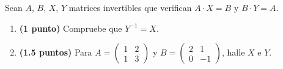 
Sean $A$, $B$, $X$, $Y$ matrices invertibles que verifican
$A\cdot X=B$ y $B\cdot Y=A$.
\begin{enumerate}[label=\alph*)]
  \item \textbf{(1 punto)} Compruebe que $Y^{-1}=X$.
  \item \textbf{(1.5 puntos)} Para
  $A=\begin{pmatrix}1&2\\1&3\end{pmatrix}$ y
  $B=\begin{pmatrix}2&1\\0&-1\end{pmatrix}$, halle $X$ e $Y$.
\end{enumerate}
